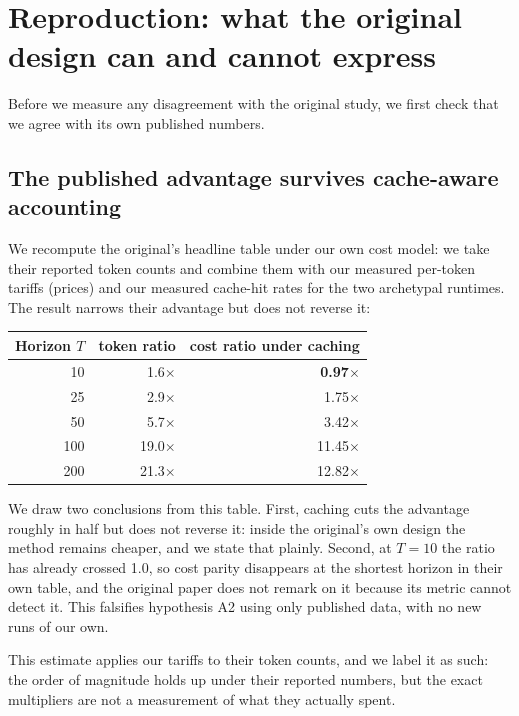 \section{Reproduction: what the original design can and cannot express}
\label{sec:repro}

Before we measure any disagreement with the original study, we first check
that we agree with its own published numbers.

\subsection{The published advantage survives cache-aware accounting}

We recompute the original's headline table under our own cost model: we take
their reported token counts and combine them with our measured per-token
tariffs (prices) and our measured cache-hit rates for the two archetypal
runtimes. The result narrows their advantage but does not reverse it\live:

\begin{center}
\begin{tabular}{@{}rrr@{}}
\toprule
Horizon $T$ & token ratio & cost ratio under caching \\
\midrule
10  & 1.6$\times$  & \textbf{0.97$\times$} \\
25  & 2.9$\times$  & 1.75$\times$ \\
50  & 5.7$\times$  & 3.42$\times$ \\
100 & 19.0$\times$ & 11.45$\times$ \\
200 & 21.3$\times$ & 12.82$\times$ \\
\bottomrule
\end{tabular}
\end{center}

We draw two conclusions from this table. First, caching cuts the advantage
roughly in half but does not reverse it: inside the original's own design the
method remains cheaper, and we state that plainly. Second, at $T{=}10$ the
ratio has already crossed 1.0, so cost parity disappears at the shortest
horizon in their own table, and the original paper does not remark on it
because its metric cannot detect it. This falsifies hypothesis A2 using only
published data, with no new runs of our own.

This estimate applies our tariffs to their token counts, and we label it as
such: the order of magnitude holds up under their reported numbers, but the
exact multipliers are not a measurement of what they actually spent.

